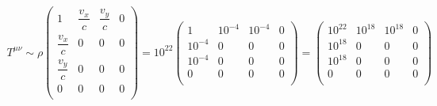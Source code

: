\documentclass[12pt]{article}
\begin{document}
\begin{align}
T^{\mu\nu} \sim \rho 
\begin{pmatrix}
1 & \dfrac{v_x}{c} & \dfrac{v_y}{c} & 0 \\
\dfrac{v_x}{c} & 0 & 0 & 0 \\
\dfrac{v_y}{c} & 0 & 0 & 0 \\
0 & 0 & 0 & 0 \\
\end{pmatrix}
= 10^{22}
\begin{pmatrix}
1 & 10^{-4} & 10^{-4} & 0 \\
10^{-4} & 0 & 0 & 0 \\
10^{-4} & 0 & 0 & 0 \\
0 & 0 & 0 & 0 \\
\end{pmatrix}
= 
\begin{pmatrix}
10^{22} & 10^{18} & 10^{18} & 0 \\
10^{18} & 0 & 0 & 0 \\
10^{18} & 0 & 0 & 0 \\
0 & 0 & 0 & 0 \\
\end{pmatrix}
\end{align}
\end{document}
